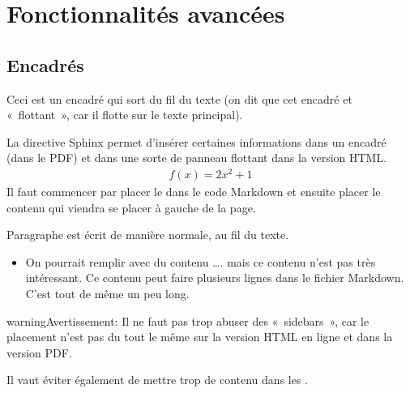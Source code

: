 \documentclass[a4,10pt,french]{sphinxmanual}
\begin{document}
\section{Fonctionnalités avancées}
\label{\detokenize{tutoriel-sphinx/advanced-features:fonctionnalites-avancees}}\label{\detokenize{tutoriel-sphinx/advanced-features:advanced-features}}\label{\detokenize{tutoriel-sphinx/advanced-features::doc}}

\subsection{Encadrés}
\label{\detokenize{tutoriel-sphinx/advanced-features:encadres}}
\begin{sphinxShadowBox}

\sphinxAtStartPar
Ceci est un encadré qui sort du fil du texte (on dit que cet encadré et
« flottant », car il flotte sur le texte principal).

\sphinxAtStartPar
La directive Sphinx  permet d’insérer certaines informations dans un
encadré (dans le PDF) et dans une sorte de panneau flottant dans la version
HTML.
\begin{equation*}
\begin{split}f(x) = 2x^2 + 1\end{split}
\end{equation*}
\sphinxAtStartPar
Il faut commencer par placer le  dans le code Markdown et ensuite
placer le contenu qui viendra se placer à gauche de la page.
\end{sphinxShadowBox}

\sphinxAtStartPar
Paragraphe est écrit de manière normale, au fil du texte.
\begin{itemize}
\item {} 
\sphinxAtStartPar
On pourrait remplir avec du contenu …. mais ce contenu n’est pas très
intéressant. Ce contenu peut faire plusieurs lignes dans le fichier Markdown.
C’est tout de même un peu long.

\end{itemize}

\begin{sphinxadmonition}{warning}{Avertissement:}
\sphinxAtStartPar
Il ne faut pas trop abuser des « sidebars », car le placement n’est pas du tout le même sur la version HTML en ligne et dans la version PDF.

\sphinxAtStartPar
Il vaut éviter également de mettre trop de contenu dans les .
\end{sphinxadmonition}
\end{document}
